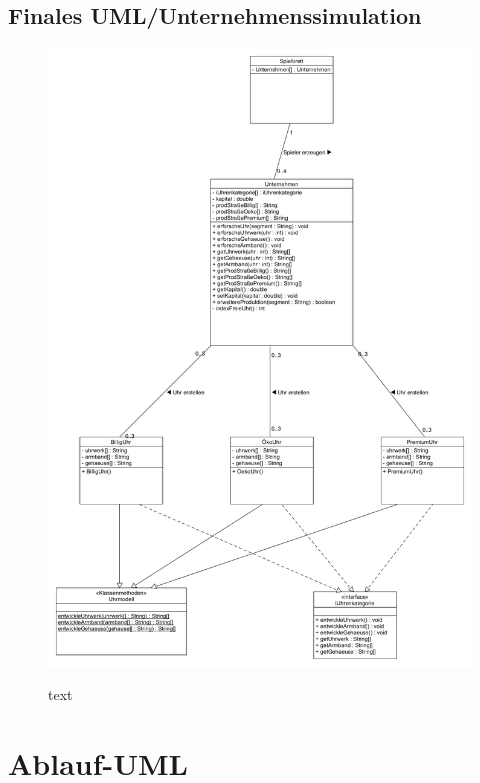 \subsection{Finales UML/Unternehmenssimulation}
\begin{figure} [!h]
	\centering
	\includegraphics[scale=0.36]{img/Unternehmenssimmulation.png} 
	\label{key}
	\caption{text}
\end{figure}
\clearpage
\section{Ablauf-UML}
